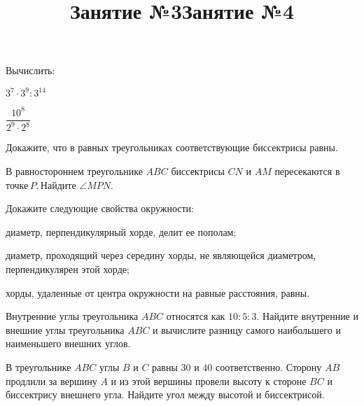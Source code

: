 	\begin{listofex}
		\item Вычислить:
	\begin{enumcols}[itemcolumns=2]
		\item \( 3^7\cdot3^9:3^{14} \)
		\item \( \dfrac{10^8}{2^9\cdot2^8} \)
	\end{enumcols}
	\item {}
	\item {}
	\item Докажите, что в равных треугольниках соответствующие биссектрисы равны.
	\item В равностороннем треугольнике \( ABC \) биссектрисы \( CN \) и \( AM \) пересекаются в точке \( P \). Найдите \( \angle MPN \).
	\item {}
	\item {}
	\item {}
	\item {}
\end{listofex}
\newpage
\title{Занятие №3}
\begin{listofex}
	\item Докажите следующие свойства окружности:
	\begin{enumcols}[itemcolumns=1]
		\item диаметр, перпендикулярный хорде, делит ее пополам;
		\item диаметр, проходящий через середину хорды, не являющейся диаметром, перпендикулярен этой хорде;
		\item хорды, удаленные от центра окружности на равные расстояния, равны.
	\end{enumcols}
	\item {}
	\item {}
	\item {}
	\item {}
	\item[\loeitem{8*}] 
\end{listofex}
\newpage
\title{Занятие №4}
\begin{listofex}
	\item Внутренние углы треугольника \( ABC \) относятся как \( 10:5:3 \). Найдите внутренние и внешние углы треугольника \( ABC \) и вычислите разницу самого наибольшего и наименьшего внешних углов.
	\item {}
	\item В треугольнике \( ABC \) углы \( B \) и \( C \) равны \( 30 \) и \( 40 \) соответственно. Сторону \( AB \) продлили за вершину \( A \) и из этой вершины провели высоту к стороне \( BC \) и биссектрису внешнего угла. Найдите угол между высотой и биссектрисой. 
	\item {}
	\item {}
	\item {}
	\item {}
	\item {}
\end{listofex}
